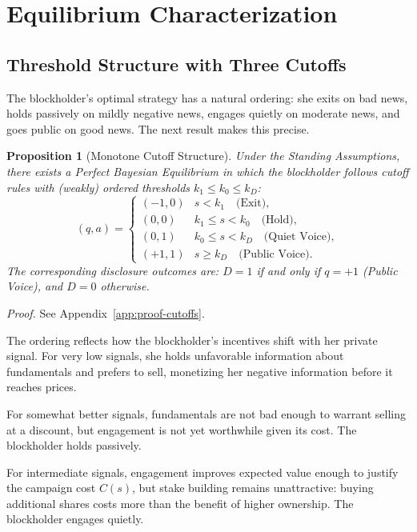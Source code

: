\documentclass[11pt]{article}
\newtheorem{proposition}{Proposition}
\newcommand{\1}{\mathbf{1}}
\begin{document}
\section{Equilibrium Characterization}
\label{sec:equilibrium}

%
\subsection{Threshold Structure with Three Cutoffs}
%

The blockholder's optimal strategy has a natural ordering: she exits on bad news, holds passively on mildly negative news, engages quietly on moderate news, and goes public on good news. The next result makes this precise.

\begin{proposition}[Monotone Cutoff Structure]
\label{prop:cutoffs}
Under the Standing Assumptions, there exists a Perfect Bayesian Equilibrium in which the blockholder follows cutoff rules with (weakly) ordered thresholds $k_1 \leq k_0 \leq k_D$:
\[
(q, a) = \begin{cases}
(-1, 0) & s < k_1 \quad \text{(Exit)}, \\
(0, 0) & k_1 \leq s < k_0 \quad \text{(Hold)}, \\
(0, 1) & k_0 \leq s < k_D \quad \text{(Quiet Voice)}, \\
(+1, 1) & s \geq k_D \quad \text{(Public Voice)}.
\end{cases}
\]
The corresponding disclosure outcomes are: $D = 1$ if and only if $q = +1$ (Public Voice), and $D = 0$ otherwise.
\end{proposition}
\textit{Proof.} See Appendix~\ref{app:proof-cutoffs}.

The ordering reflects how the blockholder's incentives shift with her private signal. For very low signals, she holds unfavorable information about fundamentals and prefers to sell, monetizing her negative information before it reaches prices.

For somewhat better signals, fundamentals are not bad enough to warrant selling at a discount, but engagement is not yet worthwhile given its cost. The blockholder holds passively.

For intermediate signals, engagement improves expected value enough to justify the campaign cost $C(s)$, but stake building remains unattractive: buying additional shares costs more than the benefit of higher ownership. The blockholder engages quietly.
\end{document}
